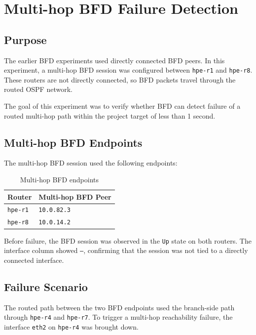 \section{Multi-hop BFD Failure Detection}

\subsection{Purpose}

The earlier BFD experiments used directly connected BFD peers. In this experiment, a multi-hop BFD session was configured between \texttt{hpe-r1} and \texttt{hpe-r8}. These routers are not directly connected, so BFD packets travel through the routed OSPF network.

The goal of this experiment was to verify whether BFD can detect failure of a routed multi-hop path within the project target of less than 1 second.

\subsection{Multi-hop BFD Endpoints}

The multi-hop BFD session used the following endpoints:

\begin{table}[H]
\centering
\small
\renewcommand{\arraystretch}{1.25}
\begin{tabular}{|p{5cm}|p{6cm}|}
\hline
\textbf{Router} & \textbf{Multi-hop BFD Peer} \\
\hline
\texttt{hpe-r1} & \texttt{10.0.82.3} \\
\hline
\texttt{hpe-r8} & \texttt{10.0.14.2} \\
\hline
\end{tabular}
\caption{Multi-hop BFD endpoints}
\end{table}

Before failure, the BFD session was observed in the \texttt{Up} state on both routers. The interface column showed \texttt{---}, confirming that the session was not tied to a directly connected interface.

\subsection{Failure Scenario}

The routed path between the two BFD endpoints used the branch-side path through \texttt{hpe-r4} and \texttt{hpe-r7}. To trigger a multi-hop reachability failure, the interface \texttt{eth2} on \texttt{hpe-r4} was brought down.

